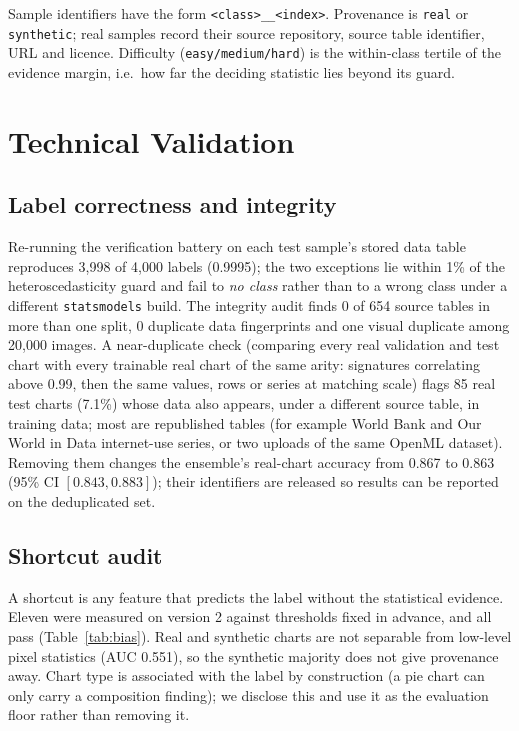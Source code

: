 \documentclass[11pt,a4paper]{article}
\begin{document}
Sample identifiers have the form \texttt{<class>\_\_<index>}. Provenance is
\texttt{real} or \texttt{synthetic}; real samples record their source repository,
source table identifier, URL and licence. Difficulty (\texttt{easy/medium/hard}) is
the within-class tertile of the evidence margin, i.e.\ how far the deciding statistic
lies beyond its guard.

\section*{Technical Validation}

\subsection*{Label correctness and integrity}
Re-running the verification battery on each test sample's stored data table
reproduces 3{,}998 of 4{,}000 labels (0.9995); the two exceptions lie within 1\% of the
heteroscedasticity guard and fail to \emph{no class} rather than to a wrong class under
a different \texttt{statsmodels} build. The integrity audit finds 0 of 654 source
tables in more than one split, 0 duplicate data fingerprints and one visual duplicate
among 20{,}000 images. A near-duplicate check (comparing every real validation and test chart with every trainable real chart of the same arity: signatures correlating above 0.99, then the same values, rows or series at matching scale) flags 85 real test charts (7.1\%) whose data also appears, under a different source table, in training data; most are republished tables (for example World Bank and Our World in Data internet-use series, or two uploads of the same OpenML dataset). Removing them changes the ensemble's real-chart accuracy from 0.867 to 0.863 (95\% CI $[0.843, 0.883]$); their identifiers are released so results can be reported on the deduplicated set.

\subsection*{Shortcut audit}
A shortcut is any feature that predicts the label without the statistical evidence.
Eleven were measured on version 2 against thresholds fixed in advance, and all pass
(Table~\ref{tab:bias}). Real and synthetic charts are not separable from low-level
pixel statistics (AUC 0.551), so the synthetic majority does not give provenance
away. Chart type is associated with the label by construction (a pie chart can only
carry a composition finding); we disclose this and use it as the evaluation floor
rather than removing it.
\end{document}
